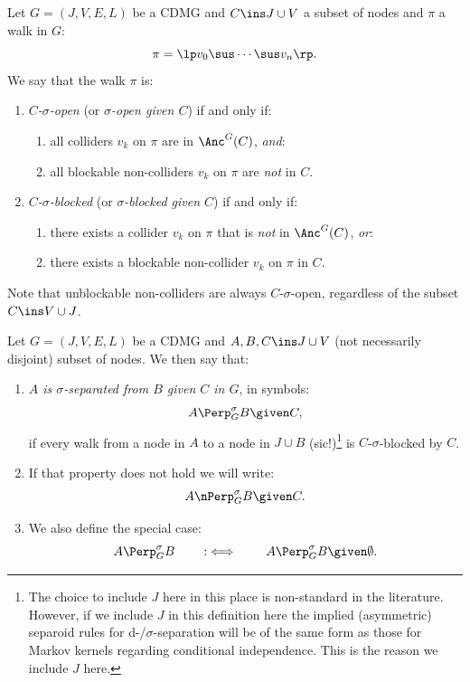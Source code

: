 \begin{Def}\label{def:sigma_blocking}
  Let $G=(J,V,E,L)$ be a CDMG and $C \ins J \cup V$ a subset of nodes and $\pi$ a walk in $G$:
  \[ \pi =\lp  v_0 \sus \cdots \sus v_n \rp.  \]
  We say that the walk $\pi$ is:
  \begin{enumerate}
    \item   \emph{$C$-$\sigma$-open} (or \emph{$\sigma$-open given $C$}) if and only if:
  \begin{enumerate}[label=\roman*.)]
      \item all colliders $v_k$ on $\pi$ are in $\Anc^G(C)$, \emph{and}:
    \item all blockable non-colliders $v_k$ on $\pi$ are \emph{not} in $C$.
  \end{enumerate}
      \item   \emph{$C$-$\sigma$-blocked}  (or \emph{$\sigma$-blocked given $C$}) if and only if:
  \begin{enumerate}[label=\roman*.)]
    \item there exists a collider $v_k$ on $\pi$ that is \emph{not} in $\Anc^G(C)$, \emph{or}:
    \item there exists a blockable non-collider $v_k$ on $\pi$ in $C$.
  \end{enumerate}  \end{enumerate}
  Note that unblockable non-colliders are always $C$-$\sigma$-open, regardless of the subset $C \ins V \cup J$.
\end{Def}


\begin{Def}\label{def:sigma_separation}
    Let $G=(J,V,E,L)$ be a CDMG and $A,B,C \ins J \cup V$ (not necessarily disjoint) subset of nodes.
    We then say that:
    \begin{enumerate}
        \item \emph{$A$ is $\sigma$-separated from $B$ given $C$ in $G$}, in symbols:
    \[ A \Perp^\sigma_G B \given C, \]
    if every walk from a node in $A$ to a node in $J \cup B$ (sic!)\footnote{The choice to include $J$ here in this place is non-standard in the literature. However, if we include $J$ in this definition here the implied (asymmetric) separoid rules for d-/$\sigma$-separation will be of the same form as those for Markov kernels regarding conditional independence. This is the reason we include $J$ here.\label{fn:why-J}} is $C$-$\sigma$-blocked by $C$.
        \item If that property does not hold we will write:
            \[ A \nPerp^\sigma_G B \given C. \]
        \item We also define the special case:
                \[ A \Perp^\sigma_G B \qquad :\iff \qquad A \Perp^\sigma_GB \given \emptyset.\]
    \end{enumerate}
\end{Def}

